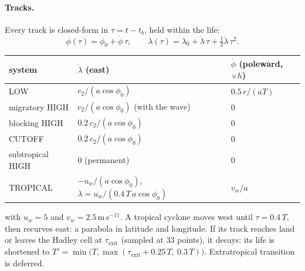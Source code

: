 \documentclass[11pt,a4paper]{article}
\begin{document}
\paragraph{Tracks.}
Every track is closed-form in $\tau=t-t_b$, held within the life:
\begin{equation}
  \phi(\tau)=\phi_0+\dot\phi\,\tau,\qquad
  \lambda(\tau)=\lambda_0+\dot\lambda\,\tau+\tfrac12\ddot\lambda\,\tau^2.
\end{equation}
\begin{center}
\begin{tabular}{lp{5.6cm}p{3.6cm}}
\toprule
system & $\dot\lambda$ (east) & $\dot\phi$ (poleward, $\times h$) \\
\midrule
LOW & $c_2/(a\cos\phi_0)$ & $0.5\,r/(aT)$\\
migratory HIGH & $c_2/(a\cos\phi_0)$ (with the wave) & 0\\
blocking HIGH & $0.2\,c_2/(a\cos\phi_0)$ & 0\\
CUTOFF & $0.2\,c_2/(a\cos\phi_0)$ & 0\\
subtropical HIGH & 0 (permanent) & 0\\
TROPICAL & $-u_w/(a\cos\phi_0)$, $\ddot\lambda=u_w/(0.4\,T\,a\cos\phi_0)$ & $v_w/a$\\
\bottomrule
\end{tabular}
\end{center}
with $u_w=5$ and $v_w=2.5$\,m\,s$^{-1}$$^\dagger$. A tropical cyclone moves west until
$\tau=0.4\,T$, then recurves east: a parabola in latitude and longitude. If its track
reaches land or leaves the Hadley cell at $\tau_{\mathrm{exit}}$ (sampled at 33 points), it
decays: its life is shortened to $T'=\min\big(T,\max(\tau_{\mathrm{exit}}+0.25\,T,\ 0.3\,T)\big)$.
Extratropical transition is deferred.
\end{document}
